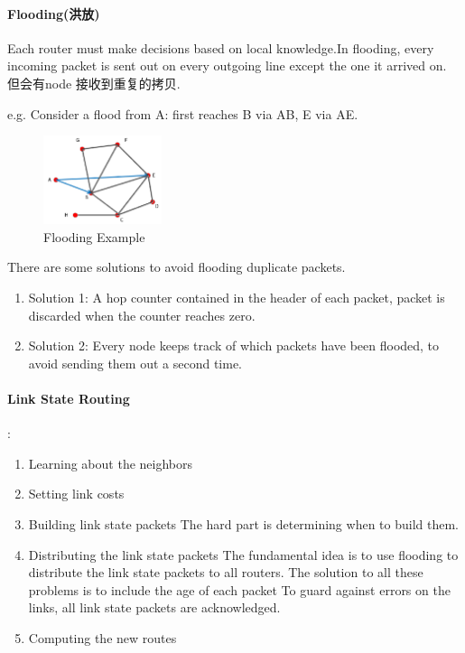 \paragraph{Flooding(洪放)}Each router must make decisions based on local knowledge.In flooding, every incoming packet is sent out on every outgoing line except the one it arrived on. 但会有node 接收到重复的拷贝. 

e.g. Consider a flood from A: first reaches B via AB, E via AE. 

\begin{figure}[!htb]
    \centering
    \includegraphics[width=0.309\textwidth]{pic/CN5/Flooding Example}
    \caption{Flooding Example}
\end{figure}

There are some solutions to avoid flooding duplicate packets.
\begin{enumerate}
    \item Solution 1: A hop counter contained in the header of each packet, packet is discarded when the counter reaches zero.
    \item Solution 2: Every node keeps track of which packets have been flooded, to avoid sending them out a second time.
\end{enumerate}

\paragraph{Link State Routing}:
\begin{enumerate}%
    \item Learning about the neighbors
    \item Setting link costs
    \item Building link state packets
    \subitem The hard part is determining when to build them.
    \item Distributing the link state packets
    \subitem The fundamental idea is to use flooding to distribute the link state packets to all routers.
    \subitem The solution to all these problems is to include the age of each packet
    \subitem To guard against errors on the links, all link state packets are acknowledged.    
    \item Computing the new routes
\end{enumerate}

